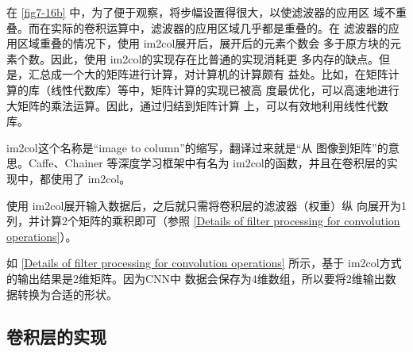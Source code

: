 在 \autoref{fig7-16b} 中，为了便于观察，将步幅设置得很大，以使滤波器的应用区
域不重叠。而在实际的卷积运算中，滤波器的应用区域几乎都是重叠的。在
滤波器的应用区域重叠的情况下，使用 im2col展开后，展开后的元素个数会
多于原方块的元素个数。因此，使用 im2col的实现存在比普通的实现消耗更
多内存的缺点。但是，汇总成一个大的矩阵进行计算，对计算机的计算颇有
益处。比如，在矩阵计算的库（线性代数库）等中，矩阵计算的实现已被高
度最优化，可以高速地进行大矩阵的乘法运算。因此，通过归结到矩阵计算
上，可以有效地利用线性代数库。

\begin{tcolorbox}
    im2col这个名称是“image to column”的缩写，翻译过来就是“从
    图像到矩阵”的意思。Caffe、Chainer 等深度学习框架中有名为
    im2col的函数，并且在卷积层的实现中，都使用了 im2col。
\end{tcolorbox}

使用 im2col展开输入数据后，之后就只需将卷积层的滤波器（权重）纵
向展开为1列，并计算2个矩阵的乘积即可（参照 \autoref{Details of filter processing for convolution operations}）。

如 \autoref{Details of filter processing for convolution operations} 所示，基于 im2col方式的输出结果是2维矩阵。因为CNN中
数据会保存为4维数组，所以要将2维输出数据转换为合适的形状。


\subsection{卷积层的实现}